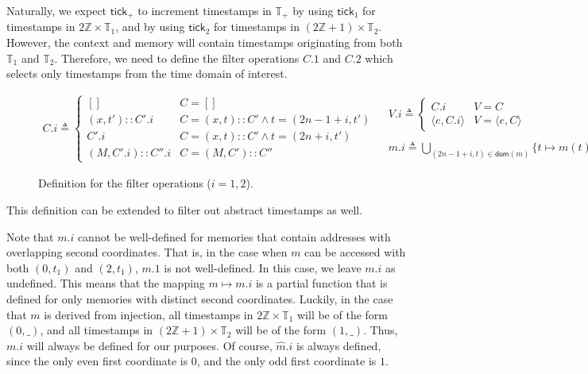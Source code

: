 \documentclass{article}
\theoremstyle{definition}
\newcommand*{\cons}{::}
\newcommand*{\A}[1]{\widehat{#1}}
\newcommand*{\Time}{\mathbb{T}}
\newcommand*{\mem}{m}
\newcommand*{\tick}{\mathsf{tick}}
\begin{document}
Naturally, we expect $\tick_+$ to increment timestamps in $\Time_+$ by using $\tick_1$ for timestamps in $2\mathbb{Z}\times\Time_1$, and by using $\tick_2$ for timestamps in $(2\mathbb{Z}+1)\times\Time_2$.
However, the context and memory will contain timestamps originating from both $\Time_1$ and $\Time_2$.
Therefore, we need to define the filter operations $C.1$ and $C.2$ which selects only timestamps from the time domain of interest.
\begin{figure}[h!]
  \[
    \begin{array}{cc}
      C.i\triangleq
      \begin{cases}
        []                  & C=[]                                \\
        (x,t')\cons C'.i    & C=(x,t)\cons C'\wedge t=(2n-1+i,t') \\
        C'.i                & C=(x,t)\cons C'\wedge t=(2n+i,t')   \\
        (M,C'.i)\cons C''.i & C=(M, C')\cons C''
      \end{cases} &
      \begin{array}{l}
        V.i\triangleq
        \begin{cases}
          C.i                  & V=C                  \\
          \langle e,C.i\rangle & V=\langle e,C\rangle
        \end{cases} \\ \\
        \mem.i\triangleq
        \displaystyle\bigcup_{(2n-1+i,t)\in\mathsf{dom}(\mem)}\{t\mapsto \mem(t).i\}
      \end{array}
    \end{array}
  \]
  \caption{Definition for the filter operations ($i=1,2$).}
  \label{fig:concfilter}
\end{figure}
This definition can be extended to filter out abstract timestamps as well.

Note that $\mem.i$ cannot be well-defined for memories that contain addresses with overlapping second coordinates.
That is, in the case when $\mem$ can be accessed with both $(0,t_1)$ and $(2,t_1)$, $\mem.1$ is not well-defined.
In this case, we leave $\mem.i$ as undefined.
This means that the mapping $\mem\mapsto\mem.i$ is a partial function that is defined for only memories with distinct second coordinates.
Luckily, in the case that $\mem$ is derived from injection, all timestamps in $2\mathbb{Z}\times\Time_1$ will be of the form $(0,\_)$, and all timestamps in $(2\mathbb{Z}+1)\times\Time_2$ will be of the form $(1,\_)$.
Thus, $\mem.i$ will always be defined for our purposes.
Of course, $\A\mem.i$ is always defined, since the only even first coordinate is $0$, and the only odd first coordinate is $1$.
\end{document}
